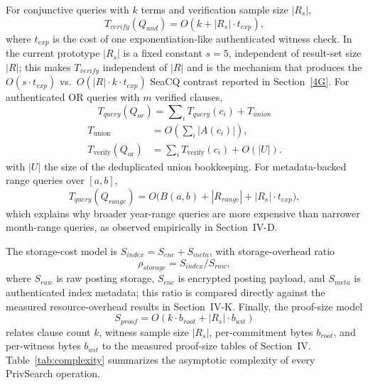 For conjunctive queries with $k$ terms and verification sample size $|R_s|$,
\begin{equation}
T_{verify}(Q_{and}) = O(k + |R_s|\cdot t_{exp}),
\label{eq:tverify-and}
\end{equation}
where $t_{exp}$ is the cost of one exponentiation-like authenticated witness check. In the current prototype $|R_s|$ is a fixed constant $s=5$, independent of result-set size $|R|$; this makes $T_{verify}$ independent of $|R|$ and is the mechanism that produces the $O(s \cdot t_{exp})$ vs.\ $O(|R|\cdot k\cdot t_{exp})$ SeaCQ contrast reported in Section~\ref{4G}. For authenticated OR queries with $m$ verified clauses,
\begin{equation}
T_{query}(Q_{or}) = \sum\nolimits_i T_{query}(c_i) + T_{union}
\end{equation}
\begin{equation}
\begin{aligned}
T_{\mathrm{union}}
  &= O\left(\sum_i |A(c_i)|\right),\\
T_{\mathrm{verify}}(Q_{\mathrm{or}})
  &= \sum_i T_{\mathrm{verify}}(c_i)+O(|U|).
\end{aligned}
\end{equation}
with $|U|$ the size of the deduplicated union bookkeeping. For metadata-backed range queries over $[a,b]$,
\begin{equation}
T_{query}(Q_{range}) = O\big(B(a,b) + |R_{range}| + |R_s|\cdot t_{exp}\big),
\label{eq:trange}
\end{equation}
which explains why broader year-range queries are more expensive than narrower month-range queries, as observed empirically in Section~IV-D.

The storage-cost model is $S_{index}=S_{enc}+S_{meta}$, with storage-overhead ratio
\begin{equation}
\rho_{storage} = S_{index}/S_{raw},
\label{eq:rho}
\end{equation}
where $S_{raw}$ is raw posting storage, $S_{enc}$ is encrypted posting payload, and $S_{meta}$ is authenticated index metadata; this ratio is compared directly against the measured resource-overhead results in Section~IV-K. Finally, the proof-size model
\begin{equation}
S_{proof} = O(k\cdot b_{root} + |R_s|\cdot b_{wit})
\end{equation}
relates clause count $k$, witness sample size $|R_s|$, per-commitment bytes $b_{root}$, and per-witness bytes $b_{wit}$ to the measured proof-size tables of Section~IV. Table~\ref{tab:complexity} summarizes the asymptotic complexity of every PrivSearch operation.

